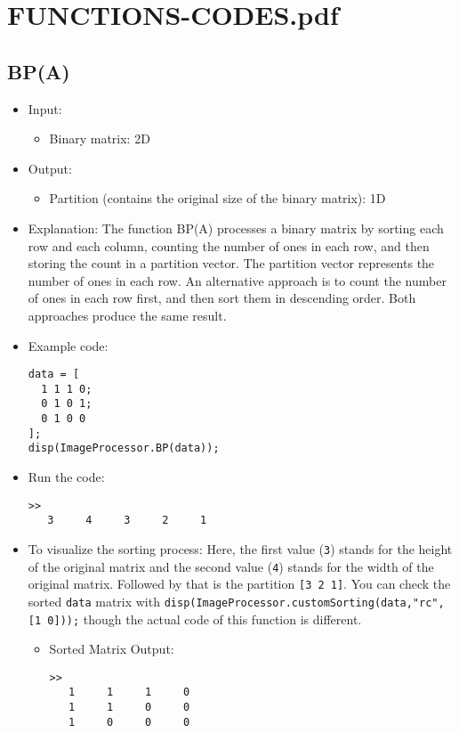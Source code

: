 \documentclass[11pt]{amsart}
\theoremstyle{remark}
\providecommand{\tightlist}{%
  \setlength{\itemsep}{0pt}\setlength{\parskip}{0pt}}
\theoremstyle{definition}
\theoremstyle{remark}
\numberwithin{equation}{section}
\begin{document}


\section{FUNCTIONS-CODES.pdf}\label{functions-codes.pdf}

\subsection{BP(A)}\label{bpa}

\begin{itemize}
\item
  Input:

  \begin{itemize}
  \tightlist
  \item
    Binary matrix: 2D
  \end{itemize}
\item
  Output:

  \begin{itemize}
  \tightlist
  \item
    Partition (contains the original size of the binary matrix): 1D
  \end{itemize}
\item
  Explanation: The function BP(A) processes a binary matrix by sorting
  each row and each column, counting the number of ones in each row, and
  then storing the count in a partition vector. The partition vector
  represents the number of ones in each row. An alternative approach is
  to count the number of ones in each row first, and then sort them in
  descending order. Both approaches produce the same result.
\item
  Example code:

\begin{verbatim}
data = [
  1 1 1 0;
  0 1 0 1;
  0 1 0 0
];
disp(ImageProcessor.BP(data));
\end{verbatim}
\item
  Run the code:

\begin{verbatim}
>> 
   3     4     3     2     1
\end{verbatim}
\item
  To visualize the sorting process: Here, the first value (\texttt{3})
  stands for the height of the original matrix and the second value
  (\texttt{4}) stands for the width of the original matrix. Followed by
  that is the partition \texttt{{[}3\ 2\ 1{]}}. You can check the sorted
  \texttt{data} matrix with
  \texttt{disp(ImageProcessor.customSorting(data,"rc",{[}1\ 0{]}));}
  though the actual code of this function is different.

  \begin{itemize}
  \item
    Sorted Matrix Output:

\begin{verbatim}
>> 
   1     1     1     0
   1     1     0     0
   1     0     0     0
\end{verbatim}
  \end{itemize}
\end{itemize}
\end{document}
